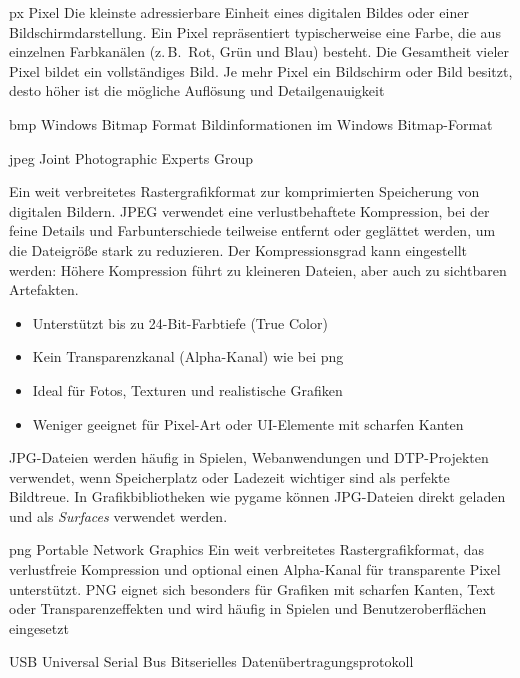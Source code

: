   {px}            %
  {Pixel}  %
  {Die kleinste adressierbare Einheit eines digitalen Bildes oder einer Bildschirmdarstellung. Ein Pixel repräsentiert typischerweise eine Farbe, die aus einzelnen Farbkanälen (z.\,B.\ Rot, Grün und Blau) besteht. Die Gesamtheit vieler Pixel bildet ein vollständiges Bild. Je mehr Pixel ein Bildschirm oder Bild besitzt, desto höher ist die mögliche Auflösung und Detailgenauigkeit} %

  {bmp}            %
  {Windows Bitmap Format}  %
  {Bildinformationen im Windows Bitmap-Format} %

  {jpeg}            %
  {Joint Photographic Experts Group}  %
  {Ein weit verbreitetes Rastergrafikformat zur komprimierten Speicherung von digitalen Bildern. JPEG verwendet eine verlustbehaftete Kompression, bei der feine Details und Farbunterschiede teilweise entfernt oder geglättet werden, um die Dateigröße stark zu reduzieren. Der Kompressionsgrad kann eingestellt werden: Höhere Kompression führt zu kleineren Dateien, aber auch zu sichtbaren Artefakten.
  	\begin{itemize}
  		\item Unterstützt bis zu 24-Bit-Farbtiefe (True Color)
  		\item Kein Transparenzkanal (Alpha-Kanal) wie bei \gls{png}
  		\item Ideal für Fotos, Texturen und realistische Grafiken
  		\item Weniger geeignet für Pixel-Art oder UI-Elemente mit scharfen Kanten
  	\end{itemize}
  	JPG-Dateien werden häufig in Spielen, Webanwendungen und DTP-Projekten 
  	verwendet, wenn Speicherplatz oder Ladezeit wichtiger sind als perfekte Bildtreue.
  	In Grafikbibliotheken wie \gls{pygame} können JPG-Dateien direkt geladen 
  	und als \textit{Surfaces} verwendet werden.} %

  {png}            %
  {Portable Network Graphics}  %
  {Ein weit verbreitetes Rastergrafikformat, das verlustfreie Kompression und optional einen Alpha-Kanal für transparente Pixel unterstützt. PNG eignet sich besonders für Grafiken mit scharfen Kanten, Text oder Transparenzeffekten und wird häufig in Spielen und Benutzeroberflächen eingesetzt} %

  {USB}            %
  {Universal Serial Bus}  %
  {Bitserielles Datenübertragungsprotokoll} %

